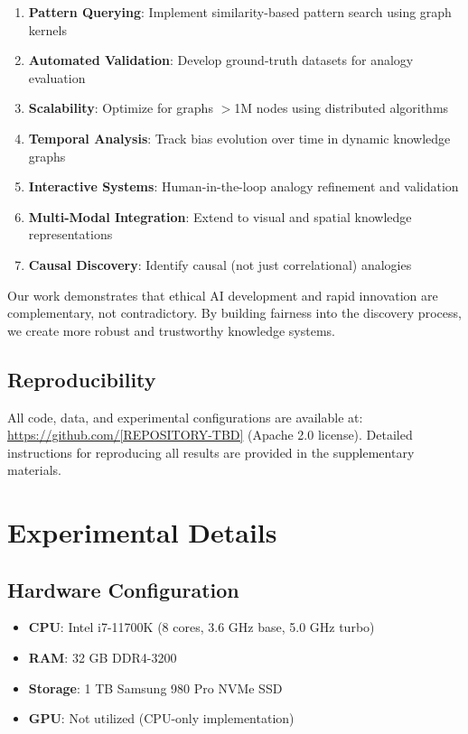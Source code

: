 \documentclass[11pt,twocolumn]{article}
\begin{document}
\begin{enumerate}
\item \textbf{Pattern Querying}: Implement similarity-based pattern search using graph kernels
\item \textbf{Automated Validation}: Develop ground-truth datasets for analogy evaluation
\item \textbf{Scalability}: Optimize for graphs $>$1M nodes using distributed algorithms
\item \textbf{Temporal Analysis}: Track bias evolution over time in dynamic knowledge graphs
\item \textbf{Interactive Systems}: Human-in-the-loop analogy refinement and validation
\item \textbf{Multi-Modal Integration}: Extend to visual and spatial knowledge representations
\item \textbf{Causal Discovery}: Identify causal (not just correlational) analogies
\end{enumerate}

Our work demonstrates that ethical AI development and rapid innovation are complementary, not contradictory. By building fairness into the discovery process, we create more robust and trustworthy knowledge systems.

\subsection{Reproducibility}

All code, data, and experimental configurations are available at: \url{https://github.com/[REPOSITORY-TBD]} (Apache 2.0 license). Detailed instructions for reproducing all results are provided in the supplementary materials.




\appendix

\section{Experimental Details}

\subsection{Hardware Configuration}

\begin{itemize}
\item \textbf{CPU}: Intel i7-11700K (8 cores, 3.6 GHz base, 5.0 GHz turbo)
\item \textbf{RAM}: 32 GB DDR4-3200
\item \textbf{Storage}: 1 TB Samsung 980 Pro NVMe SSD
\item \textbf{GPU}: Not utilized (CPU-only implementation)
\end{itemize}
\end{document}
